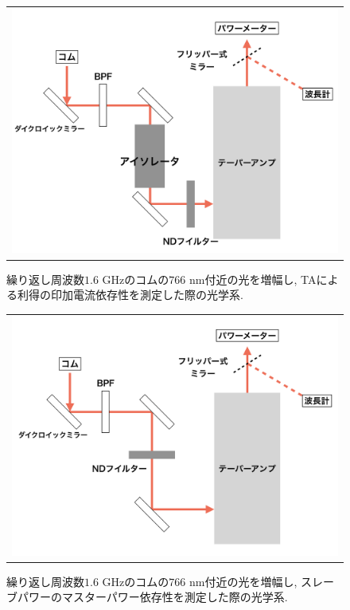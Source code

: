 \documentclass[uplatex, dvipdfmx, a4paper, report, papersize, 11pt]{jsbook}
\begin{document}
\begin{figure}[H]
  \centering
    \begin{tabular}{c}
      \begin{minipage}{1\hsize}
        \centering
          \includegraphics[keepaspectratio,  scale=0.35,  angle=0]
          {figures/chapter4/astro_amp_diagram_isolator.png}
          \caption{繰り返し周波数$1.6$ GHzのコムの$766$ nm付近の光を増幅し, TAによる利得の印加電流依存性を測定した際の光学系. }
          \label{astro_amp_diagram_isolator}
      \end{minipage}
    \end{tabular}
\end{figure}
\begin{figure}[H]
  \centering
    \begin{tabular}{c}
      \begin{minipage}{1\hsize}
        \centering
          \includegraphics[keepaspectratio,  scale=0.35,  angle=0]
          {figures/chapter4/760_astro_amp_diagram.png}
          \caption{繰り返し周波数$1.6$ GHzのコムの$766$ nm付近の光を増幅し, スレーブパワーのマスターパワー依存性を測定した際の光学系. }
          \label{760_astro_amp_diagram}
      \end{minipage}
    \end{tabular}
\end{figure}
\newpage
\end{document}
